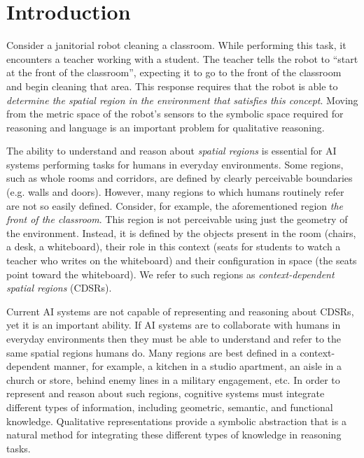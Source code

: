 \documentclass[letterpaper]{article}
\begin{document}
\section{Introduction}


Consider a janitorial robot cleaning a classroom. While performing this task, it encounters a teacher working with a student. The teacher tells the robot to ``start at the front of the classroom'', expecting it to go to the front of the classroom and begin cleaning that area. This response requires that the robot is able to \emph{determine the spatial region in the environment that satisfies this concept}. Moving from the metric space of the robot's sensors to the symbolic space required for reasoning and language is an important problem for qualitative reasoning.

The ability to understand and reason about \textit{spatial regions} is essential for AI systems performing tasks for humans in everyday environments. Some regions, such as whole rooms and corridors, are defined by clearly perceivable boundaries (e.g. walls and doors). However, many regions to which humans routinely refer are not so easily defined. Consider, for example, the aforementioned region \textit{the front of the classroom}. This region is not perceivable using just the geometry of the environment. Instead, it is defined by the objects present in the room (chairs, a desk, a whiteboard), their role in this context (seats for students to watch a teacher who writes on the whiteboard) and their configuration in space (the seats point toward the whiteboard). We refer to such regions as \textit{context-dependent spatial regions} (CDSRs). 

Current AI systems are not capable of representing and reasoning about CDSRs, yet it is an important ability. If AI systems are to collaborate with humans in everyday environments then they must be able to understand and refer to the same spatial regions humans do. Many regions are best defined in a context-dependent manner, for example, a kitchen in a studio apartment, an aisle in a church or store, behind enemy lines in a military engagement, etc. In order to represent and reason about such regions, cognitive systems must integrate different types of information, including geometric, semantic, and functional knowledge. Qualitative representations provide a symbolic abstraction that is a natural method for integrating these different types of knowledge in reasoning tasks.
\end{document}
